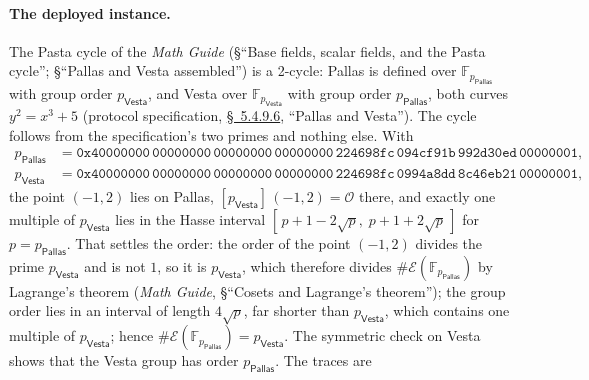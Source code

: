 \documentclass[11pt,a4paper]{article}
\theoremstyle{definition}
\newcommand{\F}{\mathbb{F}}
\newcommand{\Pallas}{\ensuremath{\mathsf{Pallas}}}
\newcommand{\Vesta}{\ensuremath{\mathsf{Vesta}}}
\newcommand{\Ep}{\ensuremath{\mathcal{E}}}
\begin{document}
\paragraph{The deployed instance.}
The Pasta cycle of the \emph{Math Guide} (\S``Base fields, scalar
fields, and the Pasta cycle''; \S``Pallas and Vesta assembled'') is a
2-cycle: Pallas is defined over $\F_{p_{\Pallas}}$ with group order
$p_{\Vesta}$, and Vesta over $\F_{p_{\Vesta}}$ with group order
$p_{\Pallas}$, both curves $y^{2} = x^{3} + 5$ (protocol specification,
\href{https://zips.z.cash/protocol/protocol.pdf\#pallasandvesta}{\S~5.4.9.6},
``Pallas and Vesta''). The cycle follows from the specification's two
primes and nothing else.
With
\begin{align*}
p_{\Pallas} &= \mathtt{0x40000000\,00000000\,00000000\,00000000\,
  224698fc\,094cf91b\,992d30ed\,00000001},\\
p_{\Vesta}  &= \mathtt{0x40000000\,00000000\,00000000\,00000000\,
  224698fc\,0994a8dd\,8c46eb21\,00000001},
\end{align*}
the point $(-1, 2)$ lies on Pallas, $[p_{\Vesta}]\,(-1, 2) =
\mathcal O$ there, and exactly one multiple of
$p_{\Vesta}$ lies in the Hasse interval $[\,p + 1 - 2\sqrt p,\; p + 1 +
2\sqrt p\,]$ for $p = p_{\Pallas}$. That settles the order: the order
of the point $(-1, 2)$ divides the prime $p_{\Vesta}$ and is not $1$,
so it is $p_{\Vesta}$, which therefore divides $\#\Ep(\F_{p_{\Pallas}})$
by Lagrange's theorem (\emph{Math Guide}, \S``Cosets and Lagrange's
theorem''); the group order lies in an interval of length $4\sqrt p$,
far shorter than $p_{\Vesta}$, which contains one multiple of
$p_{\Vesta}$; hence $\#\Ep(\F_{p_{\Pallas}}) = p_{\Vesta}$. The
symmetric check on Vesta shows that the Vesta group has order
$p_{\Pallas}$. The traces are
\end{document}
